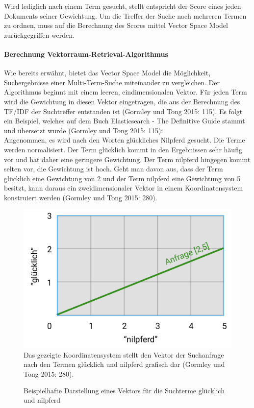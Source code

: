 \documentclass[a4paper]{scrartcl}
\begin{document}
Wird lediglich nach einem Term gesucht, stellt entspricht der Score eines jeden Dokuments seiner Gewichtung. Um die Treffer der Suche nach mehreren Termen zu ordnen, muss auf die Berechnung des Scores mittel Vector Space Model zurückgegriffen werden.

\paragraph{Berechnung Vektorraum-Retrieval-Algorithmus}
Wie bereits erwähnt, bietet das Vector Space Model die Möglichkeit, Suchergebnisse einer Multi-Term-Suche miteinander zu vergleichen. Der Algorithmus beginnt mit einem leeren, eindimensionalen Vektor. Für jeden Term wird die Gewichtung in diesen Vektor eingetragen, die aus der Berechnung des TF/IDF der Suchtreffer entstanden ist (Gormley und Tong 2015: 115). Es folgt ein Beispiel, welches auf dem Buch Elasticsearch - The Definitive Guide stammt und übersetzt wurde (Gormley und Tong 2015: 115): \\

Angenommen, es wird nach den Worten glückliches Nilpferd gesucht. Die Terme werden normalisiert. Der Term glücklich kommt in den Ergebnissen sehr häufig vor und hat daher eine geringere Gewichtung. Der Term nilpferd hingegen kommt selten vor, die Gewichtung ist hoch. Geht man davon aus, dass der Term glücklich eine Gewichtung von 2 und der Term nilpferd eine Gewichtung von 5 besitzt, kann daraus ein zweidimensionaler Vektor in einem Koordinatensystem konstruiert werden (Gormley und Tong 2015: 280).

\begin{figure}[h!]
	\centering
	\caption{Beispielhafte Darstellung eines Vektors für die Suchterme glücklich und nilpferd}
	\includegraphics[scale=0.35]{assets/Diagram_1} \\
	Das gezeigte Koordinatensystem stellt den Vektor der Suchanfrage nach den Termen glücklich und nilpferd grafisch dar (Gormley und Tong 2015: 280).
\end{figure}
\end{document}

